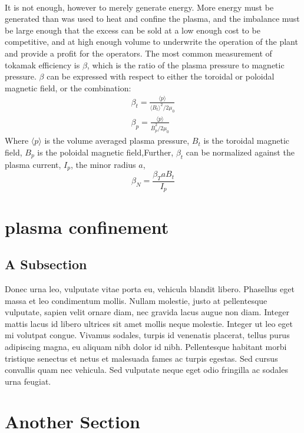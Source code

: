 \paragraph{}
It is not enough, however to merely generate energy.  More energy must be generated than was used to heat and confine the plasma, and the imbalance must be large enough that the excess can be sold at a low enough cost to be competitive, and at high enough volume to underwrite the operation of the plant and provide a profit for the operators.  The most common measurement of tokamak efficiency is $\beta$, which is the ratio of the plasma pressure to magnetic pressure.  $\beta$ can be expressed with respect to either the toroidal or poloidal magnetic field, or the combination:
\begin{eqnarray}	
\beta_t = \frac{\langle p \rangle}{\langle B_t \rangle^2/2\mu_0}\\
\beta_p = \frac{\langle p \rangle}{\overline{B}_p^2/2\mu_0}
\end{eqnarray}
Where $\langle p \rangle$ is the volume averaged plasma pressure, $B_t$ is the toroidal magnetic field, $B_p$ is the poloidal magnetic field,Further, $\beta_t$ can be normalized against the plasma current, $I_p$, the minor radius $a$, \begin{equation}
\beta_N = \frac{\beta_T a B_t}{I_p}
\end{equation}
\section{plasma confinement}

\subsection{A Subsection}

Donec urna leo, vulputate vitae porta eu, vehicula blandit libero. Phasellus eget massa et leo condimentum mollis. Nullam molestie, justo at pellentesque vulputate, sapien velit ornare diam, nec gravida lacus augue non diam. Integer mattis lacus id libero ultrices sit amet mollis neque molestie. Integer ut leo eget mi volutpat congue. Vivamus sodales, turpis id venenatis placerat, tellus purus adipiscing magna, eu aliquam nibh dolor id nibh. Pellentesque habitant morbi tristique senectus et netus et malesuada fames ac turpis egestas. Sed cursus convallis quam nec vehicula. Sed vulputate neque eget odio fringilla ac sodales urna feugiat.

\section{Another Section}

